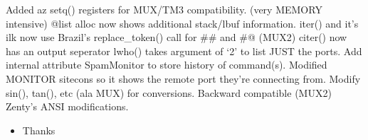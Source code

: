 \documentclass[letterpaper,10pt,english]{sphinxmanual}
\begin{document}
\sphinxAtStartPar
Added a\sphinxhyphen{}z setq() registers for MUX/TM3 compatibility. (very MEMORY intensive)
@list alloc now shows additional stack/lbuf information.
iter() and it’s ilk now use Brazil’s replace\_token() call for \#\# and \#@ (MUX2)
citer() now has an output seperator
lwho() takes argument of ‘2’ to list JUST the ports.
Add internal attribute SpamMonitor to store history of command(s).
Modified MONITOR sitecons so it shows the remote port they’re connecting from.
Modify sin(), tan(), etc (ala MUX) for conversions.  Backward compatible (MUX2)
Zenty’s ANSI modifications.
\begin{itemize}
\item {} 
\sphinxAtStartPar
Thanks 

\end{itemize}
\end{document}
